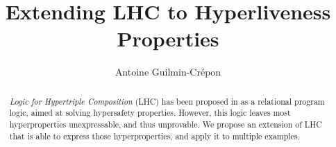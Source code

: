 \documentclass[acmsmall,screen,nonacm,appendix]{acmart}
\title{Extending LHC to Hyperliveness Properties}
\author{Antoine Guilmin-Crépon}
\affiliation{%
  \institution{ENS Paris-Saclay}
  \city{Gif-Sur-Yvette}
  \country{France}
}
\begin{document}
\begin{abstract}
  \emph{Logic for Hypertriple Composition} (LHC) has been proposed in \citet{DOsualdo22} as a relational program logic, aimed at solving hypersafety properties. However, this logic leaves most hyperproperties unexpressable, and thus unprovable. We propose an extension of LHC that is able to express those hyperproperties, and apply it to multiple examples. 
\end{abstract}

\maketitle










\appendix

%


\end{document}
